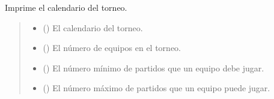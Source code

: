 \documentclass[letterpaper,10pt,spanish]{sphinxmanual}
\begin{document}
\begin{fulllineitems}
\label{\detokenize{Funcionales:Funcionales.calendario.imprimir_calendario}}
\pysigstartsignatures
{}
\pysigstopsignatures
\sphinxAtStartPar
Imprime el calendario del torneo.
\begin{quote}\begin{description}
\begin{itemize}
\item {} 
\sphinxAtStartPar
{} () \textendash{} El calendario del torneo.

\item {} 
\sphinxAtStartPar
{} () \textendash{} El número de equipos en el torneo.

\item {} 
\sphinxAtStartPar
{} () \textendash{} El número mínimo de partidos que un equipo debe jugar.

\item {} 
\sphinxAtStartPar
{} () \textendash{} El número máximo de partidos que un equipo puede jugar.

\end{itemize}

\end{description}\end{quote}

\end{fulllineitems}

\end{document}
